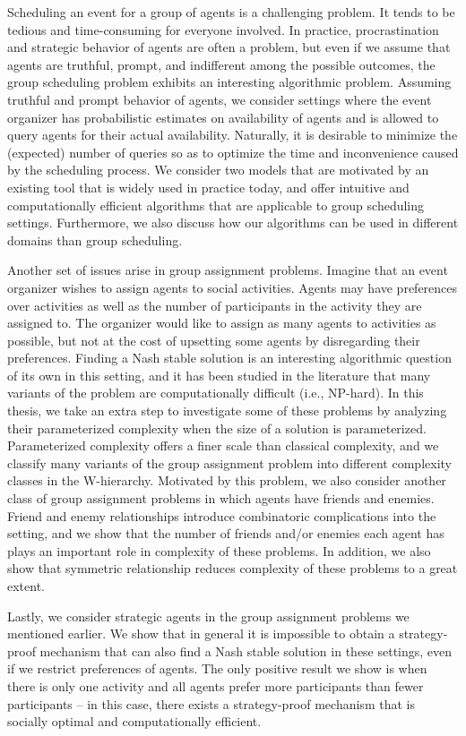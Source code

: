 Scheduling an event for a group of agents is a challenging problem. 
It tends to be tedious and time-consuming for everyone involved. 
In practice, procrastination and strategic behavior of agents are often a problem, but even if we assume that agents are truthful, prompt, and indifferent among the possible outcomes, the group scheduling problem exhibits an interesting algorithmic problem. Assuming truthful and prompt behavior of agents, we consider settings where the event organizer has probabilistic estimates on availability of agents and is allowed to query agents for their actual availability. Naturally, it is desirable to minimize the (expected) number of queries so as to optimize the time and inconvenience caused by the scheduling process. We consider two models that are motivated by an existing tool that is widely used in practice today, and offer intuitive and computationally efficient algorithms that are applicable to group scheduling settings. Furthermore, we also discuss how our algorithms can be used in different domains than group scheduling. 

Another set of issues arise in group assignment problems. Imagine that an event organizer wishes to assign agents to social activities. Agents may have preferences over activities as well as the number of participants in the activity they are assigned to. The organizer would like to assign as many agents to activities as possible, but not at the cost of upsetting some agents by disregarding their preferences. Finding a Nash stable solution is an interesting algorithmic question of its own in this setting, and it has been studied in the literature that many variants of the problem are computationally difficult (i.e., NP-hard). In this thesis, we take an extra step to investigate some of these problems by analyzing their parameterized complexity when the size of a solution is parameterized. Parameterized complexity offers a finer scale than classical complexity, and we classify many variants of the group assignment problem into different complexity classes in the W-hierarchy. Motivated by this problem, we also consider another class of group assignment problems in which agents have friends and enemies. Friend and enemy relationships introduce combinatoric complications into the setting, and we show that the number of friends and/or enemies each agent has plays an important role in complexity of these problems. In addition, we also show that symmetric relationship reduces complexity of these problems to a great extent.

Lastly, we consider strategic agents in the group assignment problems we mentioned earlier. We show that in general it is impossible to obtain a strategy-proof mechanism that can also find a Nash stable solution in these settings, even if we restrict preferences of agents. The only positive result we show is when there is only one activity and all agents prefer more participants than fewer participants -- in this case, there exists a strategy-proof mechanism that is socially optimal and computationally efficient. 